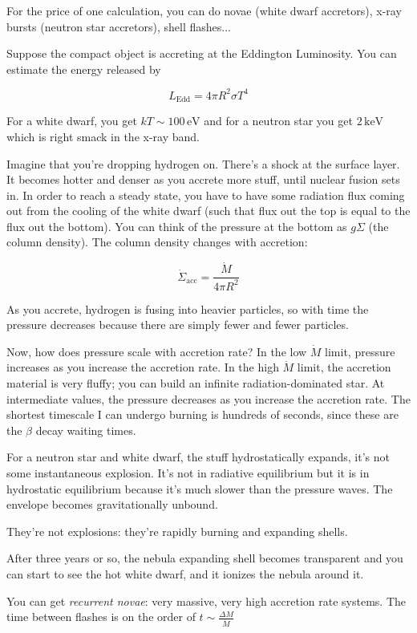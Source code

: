 \documentclass[a4paper]{article}
\newcommand{\ledd}{L_{\mathrm{Edd}}}
\begin{document}
\begin{enumerate}
For the price of one calculation, you can do novae (white dwarf accretors), x-ray bursts (neutron star accretors), shell flashes...

Suppose the compact object is accreting at the Eddington Luminosity. You can estimate the energy released by

$$ \ledd = 4 \pi R^2 \sigma T^4 $$

For a white dwarf, you get $kT \sim 100\,\mathrm{eV}$ and for a neutron star you get $2\,\mathrm{keV}$ which is right smack in the x-ray band.

Imagine that you're dropping hydrogen on. There's a shock at the surface layer. It becomes hotter and denser as you accrete more stuff, until nuclear fusion sets in. In order to reach a steady state, you have to have some radiation flux coming out from the cooling of the white dwarf (such that flux out the top is equal to the flux out the bottom). You can think of the pressure at the bottom as $g \Sigma$ (the column density). The column density changes with accretion:

$$ \dot{\Sigma}_\mathrm{acc} = \frac{\dot{M}}{4 \pi R^2} $$

As you accrete, hydrogen is fusing into heavier particles, so with time the pressure decreases because there are simply fewer and fewer particles.

Now, how does pressure scale with accretion rate? 
In the low $\dot{M}$ limit, pressure increases as you increase the accretion rate. In the high $\dot{M}$ limit, the accretion material is very fluffy; you can build an infinite radiation-dominated star. 
At intermediate values, the pressure decreases as you increase the accretion rate. 
The shortest timescale I can undergo burning is hundreds of seconds, since these are the $\beta$ decay waiting times. 

For a neutron star and white dwarf, the stuff hydrostatically expands, it's not some instantaneous explosion. It's not in radiative equilibrium but it is in hydrostatic equilibrium because it's much slower than the pressure waves. The envelope becomes gravitationally unbound. 

They're not explosions: they're rapidly burning and expanding shells.

After three years or so, the nebula expanding shell becomes transparent and you can start to see the hot white dwarf, and it ionizes the nebula around it. 

You can get \emph{recurrent novae}: very massive, very high accretion rate systems. The time between flashes is on the order of $ t \sim \frac{\Delta M}{\dot{M}} $


\end{enumerate}
\end{document}
